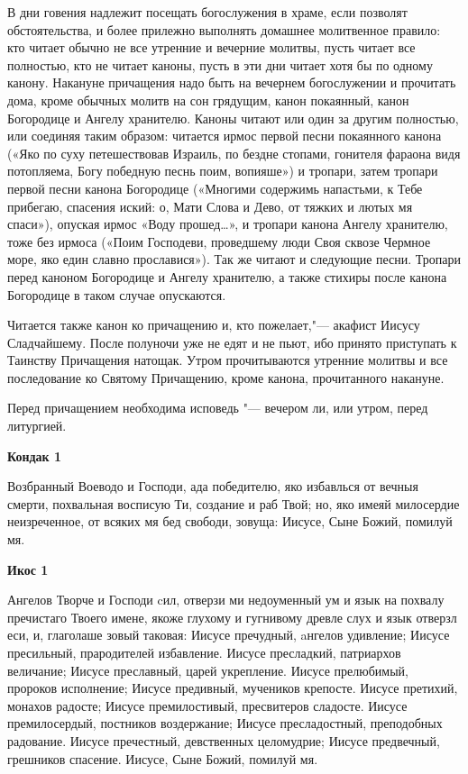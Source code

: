    В дни говения надлежит посещать богослужения в храме, если позволят
обстоятельства, и более прилежно выполнять домашнее молитвенное
правило: кто читает обычно не все утренние и вечерние молитвы, пусть
читает все полностью, кто не читает каноны, пусть в эти дни читает хотя бы
по одному канону. Накануне причащения надо быть на вечернем
богослужении и прочитать дома, кроме обычных молитв на сон грядущим,
канон покаянный, канон Богородице и Ангелу хранителю. Каноны читают
или один за другим полностью, или соединяя таким образом: читается
ирмос первой песни покаянного канона («Яко по суху петешествовав
Израиль, по бездне стопами, гонителя фараона видя потопляема, Богу
победную песнь поим, вопияше») и тропари, затем тропари первой
песни канона Богородице («Многими содержимь напастьми, к Тебе
прибегаю, спасения иский: о, Мати Слова и Дево, от тяжких и лютых мя
спаси»), опуская ирмос «Воду прошед…», и тропари канона Ангелу
хранителю, тоже без ирмоса («Поим Господеви, проведшему люди Своя
сквозе Чермное море, яко един славно прославися»). Так же читают
и следующие песни. Тропари перед каноном Богородице и Ангелу
хранителю, а также стихиры после канона Богородице в таком случае
опускаются.


   Читается также канон ко причащению и, кто пожелает,"--- акафист Иисусу
Сладчайшему. После полуночи уже не едят и не пьют, ибо принято
приступать к Таинству Причащения натощак. Утром прочитываются
утренние молитвы и все последование ко Святому Причащению, кроме
канона, прочитанного накануне.


   Перед причащением необходима исповедь "--- вечером ли, или утром, перед
литургией.

   


\mychapterending





\bfseries Кондак 1\normalfont{}


Возбранный Воеводо и Господи, ада победителю, яко избавлься от вечныя смерти, похвальная восписую Ти, создание и раб Твой; но, яко имеяй милосердие неизреченное, от всяких мя бед свободи, зовуща: Иисусе, Сыне Божий, помилуй мя.


\medskip


\bfseries Икос 1\normalfont{}


Ангелов Творче и Господи cил, отверзи ми недоуменный ум и язык на похвалу пречистаго Твоего имене, якоже глухому и гугнивому древле слух и язык отверзл еси, и, глаголаше зовый таковая: Иисусе пречудный, aнгелов удивление; Иисусе пресильный, прародителей избавление. Иисусе пресладкий, патриархов величание; Иисусе преславный, царей укрепление. Иисусе прелюбимый, пророков исполнение; Иисусе предивный, мучеников крепосте. Иисусе претихий, монахов радосте; Иисусе премилостивый, пресвитеров сладосте. Иисусе премилосердый, постников воздержание; Иисусе пресладостный, преподобных радование. Иисусе пречестный, девственных целомудрие; Иисусе предвечный, грешников спасение. Иисусе, Сыне Божий, помилуй мя.


